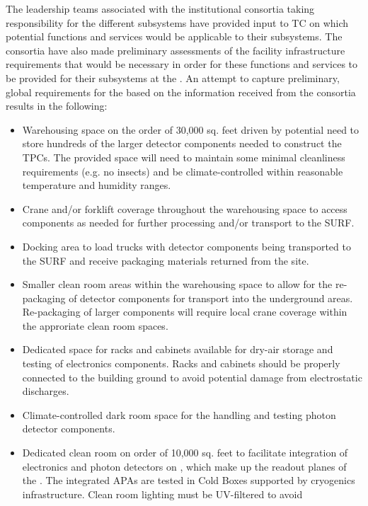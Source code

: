 The leadership teams associated with the  institutional
consortia taking responsibility for the different 
subsystems have provided input to TC on which potential 
functions and services would be applicable to their subsystems.  The
consortia have also made preliminary assessments of the facility
infrastructure requirements that would be necessary in order for these
functions and services to be provided for their subsystems at the
.  An attempt to capture preliminary, global requirements
for the  based on the information received from the
consortia results in the following:
\begin{itemize}
  \item Warehousing space on the order of 30,000 sq. feet driven by
    potential need to store hundreds of the larger detector components
    needed to construct the TPCs.  The provided space will need to
    maintain some minimal cleanliness requirements (e.g. no insects)
    and be climate-controlled within reasonable temperature and
    humidity ranges.
  \item Crane and/or forklift coverage throughout the warehousing
    space to access components as needed for further processing and/or
    transport to the SURF.
  \item Docking area to load trucks with detector components being
    transported to the SURF and receive packaging materials
    returned from the site.
  \item Smaller clean room areas within the warehousing space to
    allow for the re-packaging of detector components for transport
    into the underground areas.  Re-packaging of larger components
    will require local crane coverage within the approriate clean room
    spaces.
  \item Dedicated space for racks and cabinets available for dry-air
    storage and testing of electronics components.  Racks and cabinets
    should be properly connected to the building ground to avoid
    potential damage from electrostatic discharges.
  \item Climate-controlled dark room space for the handling and
    testing photon detector components.
  \item Dedicated clean room on order of 10,000 sq. feet to facilitate
    integration of electronics and photon detectors on ,
    which make up the readout planes of the  . The
    integrated APAs are tested in Cold Boxes supported by cryogenics
    infrastructure.  Clean room lighting must be UV-filtered to avoid

\end{itemize}
